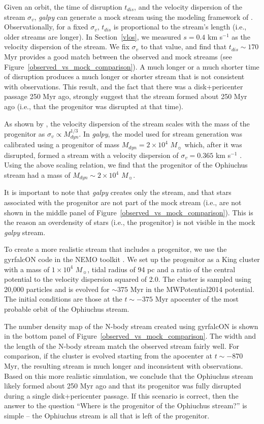 \documentclass[iop]{emulateapj}
\begin{document}
Given an orbit, the time of disruption $t_{dis}$, and the velocity dispersion of
the stream $\sigma_v$, {\em galpy} can generate a mock stream using the modeling
framework of \citet{bov14}. Observationally, for a fixed $\sigma_v$, $t_{dis}$
is proportional to the stream's length (i.e., older streams are longer). In
Section~\ref{vlos}, we measured $s=0.4$ km s$^{-1}$ as the velocity dispersion
of the stream. We fix $\sigma_v$ to that value, and find that $t_{dis}\sim170$
Myr provides a good match between the observed and mock streams (see
Figure~\ref{observed_vs_mock_comparison}). A much longer or a much shorter time
of disruption produces a much longer or shorter stream that is not consistent
with observations. This result, and the fact that there was a disk+pericenter
passage 250 Myr ago, strongly suggest that the stream formed about 250 Myr ago
(i.e., that the progenitor was disrupted at that time).

As shown by \citet{sb13}, the velocity dispersion of the stream scales with the 
mass of the progenitor as $\sigma_v \propto M_{dyn}^{1/3}$. In {\em galpy}, the
model used for stream generation was calibrated using a progenitor of mass
$M_{dyn}=2\times10^4$ $M_\sun$ which, after it was disrupted, formed a stream
with a velocity dispersion of $\sigma_v=0.365$ km s$^{-1}$ \citep{bov14}. Using
the above scaling relation, we find that the progenitor of the Ophiuchus stream
had a mass of $M_{dyn}\sim2\times10^4$ $M_\sun$.

It is important to note that {\em galpy} creates only the stream, and that stars
associated with the progenitor are not part of the mock stream (i.e., are not
shown in the middle panel of Figure~\ref{observed_vs_mock_comparison}). This is
the reason an overdensity of stars (i.e., the progenitor) is not visible in the
mock {\em galpy} stream.

To create a more realistic stream that includes a progenitor, we use the
gyrfalcON code \citep{deh00,deh02} in the NEMO toolkit \citep{teu95}. We set up
the progenitor as a King cluster \citep{kin66} with a mass of $1\times10^4$
$M_\sun$, tidal radius of 94 pc and a ratio of the central potential to the
velocity dispersion squared of 2.0. The cluster is sampled using 20,000
particles and is evolved for $\sim375$ Myr in the MWPotential2014 potential. The
initial conditions are those at the $t\sim-375$ Myr apocenter of the most
probable orbit of the Ophiuchus stream.

The number density map of the N-body stream created using gyrfalcON is shown in
the bottom panel of Figure~\ref{observed_vs_mock_comparison}. The width and the
length of the N-body stream match the observed stream fairly well. For
comparison, if the cluster is evolved starting from the apocenter at
$t\sim-870$ Myr, the resulting stream is much longer and inconsistent with
observations. Based on this more realistic simulation, we conclude that the
Ophiuchus stream likely formed about 250 Myr ago and that its progenitor was
fully disrupted during a single disk+pericenter passage. If this scenario is
correct, then the answer to the question ``Where is the progenitor of the
Ophiuchus stream?'' is simple -- the Ophiuchus stream is all that is left of
the progenitor.
\end{document}
